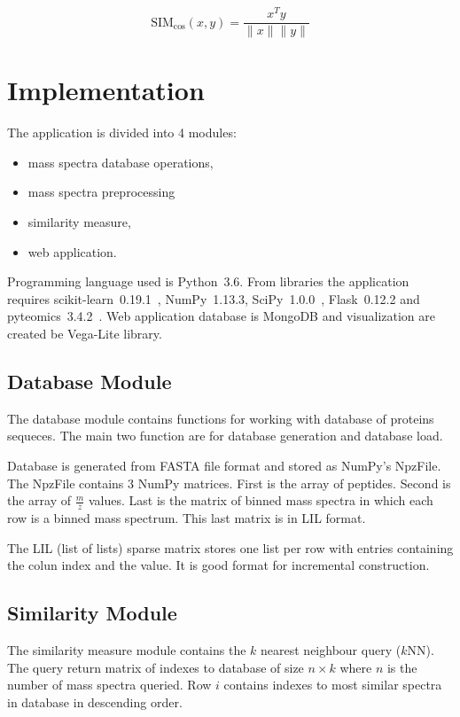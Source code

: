\documentclass[a4paper,10pt,twocolumn]{article}
\begin{document}
\[ \text{SIM}_{\cos}(x, y) = \frac{x^Ty}{\|x\|\|y\|} \]

\section{Implementation}

The application is divided into 4 modules:

\begin{itemize}
    \item mass spectra database operations,
    \item mass spectra preprocessing
    \item similarity measure,
    \item web application.
\end{itemize}

Programming language used is Python~3.6. From libraries the application requires
scikit-learn~0.19.1~\cite{scikit-learn}, NumPy~1.13.3,
SciPy~1.0.0~\cite{scipy}, Flask~0.12.2 and
pyteomics~3.4.2~\cite{Goloborodko2013}. Web application database is MongoDB 
and visualization are created be Vega-Lite library.

\subsection{Database Module}

The database module contains functions for working with database of
proteins sequeces. The main two function are for database generation and
database load.

Database is generated from FASTA file format and stored as NumPy's NpzFile.
The NpzFile contains 3 NumPy matrices. First is the array of peptides.
Second is the array of \(\frac{m}{z}\) values. Last is the matrix of binned
mass spectra in which each row is a binned mass spectrum. This last
matrix is in LIL format.

The LIL (list of lists) sparse matrix stores one list per row with entries
containing the colun index and the value. It is good format for incremental
construction.

\subsection{Similarity Module}

The similarity measure module contains the \(k\) nearest neighbour query 
(\(k\)NN). The query return matrix of indexes to database of size
\(n \times k\) where \(n\) is the number of mass spectra queried.
Row \(i\) contains indexes to most similar spectra in database in
descending order.
\end{document}
